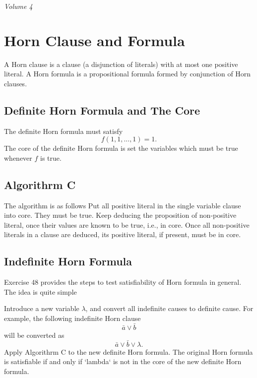 

\notespagesize
%
\hfill {\it Volume 4}
%
\section{Horn Clause and Formula}

A Horn clause is a clause (a disjunction of literals) with at most one positive
literal.  A Horn formula is a propositional formula formed by conjunction of
Horn clauses.

\subsection{Definite Horn Formula and The Core}
The definite Horn formula
must satisfy
$$
f(1, 1, ..., 1) = 1.
$$
The core of the definite Horn formula is set the variables which must be true
whenever $f$ is true.

\subsection{Algorithrm C}

The algorithm is as follows
\numberedlist
\li Put all positive literal in the single variable clause into core.  They must
    be true.
\li Keep deducing the proposition of non-positive literal, once their values
    are known to be true, i.e., in core. Once all non-positive literals in a
    clause are deduced, its positive literal, if present, must be in core.
\endnumberedlist

\subsection{Indefinite Horn Formula}

Exercise 48 provides the steps to test satisfiability of Horn formula in
general. The idea is quite simple

\numberedlist
\li Introduce a new variable $\lambda$, and convert all indefinite
causes to definite cause. For example, the following indefinite Horn clause
$$
\bar a \vee \bar b  %
$$
will be converted as
$$
\bar a \vee \bar b \vee \lambda.
$$
\li Apply Algorithrm C to the new definite Horn formula. The original
Horn formula is satisfiable if and only if `lambda` is not in the core of the
new definite Horn formula.
\endnumberedlist

\vfill
\bye
